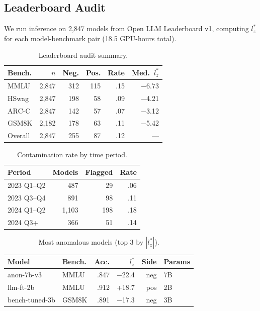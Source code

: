 \documentclass[11pt,a4paper]{article}
\begin{document}
\subsection{Leaderboard Audit}
\label{sec:leaderboard}

We run inference on 2{,}847 models from Open LLM Leaderboard v1, computing $l_z^*$ for each model-benchmark pair (18.5 GPU-hours total).

\begin{table}[t]
\centering
\caption{Leaderboard audit summary.}
\label{tab:leaderboard}
\small
\begin{tabular}{lrrrrr}
\toprule
\textbf{Bench.} & $n$ & \textbf{Neg.} & \textbf{Pos.} & \textbf{Rate} & \textbf{Med.\ $l_z^*$} \\
\midrule
MMLU & 2{,}847 & 312 & 115 & .15 & $-$6.73 \\
HSwag & 2{,}847 & 198 & 58 & .09 & $-$4.21 \\
ARC-C & 2{,}847 & 142 & 57 & .07 & $-$3.12 \\
GSM8K & 2{,}182 & 178 & 63 & .11 & $-$5.42 \\
Overall & 2{,}847 & 255 & 87 & .12 & --- \\
\bottomrule
\end{tabular}
\end{table}

\begin{table}[t]
\centering
\caption{Contamination rate by time period.}
\label{tab:temporal}
\small
\begin{tabular}{lrrr}
\toprule
\textbf{Period} & \textbf{Models} & \textbf{Flagged} & \textbf{Rate} \\
\midrule
2023 Q1--Q2 & 487 & 29 & .06 \\
2023 Q3--Q4 & 891 & 98 & .11 \\
2024 Q1--Q2 & 1{,}103 & 198 & .18 \\
2024 Q3+ & 366 & 51 & .14 \\
\bottomrule
\end{tabular}
\end{table}

\begin{table}[t]
\centering
\caption{Most anomalous models (top 3 by $|l_z^*|$).}
\label{tab:top-anomalous}
\small
\begin{tabular}{llrrrl}
\toprule
\textbf{Model} & \textbf{Bench.} & \textbf{Acc.} & $l_z^*$ & \textbf{Side} & \textbf{Params} \\
\midrule
anon-7b-v3 & MMLU & .847 & $-$22.4 & neg & 7B \\
llm-ft-2b & MMLU & .912 & +18.7 & pos & 2B \\
bench-tuned-3b & GSM8K & .891 & $-$17.3 & neg & 3B \\
\bottomrule
\end{tabular}
\end{table}
\end{document}
